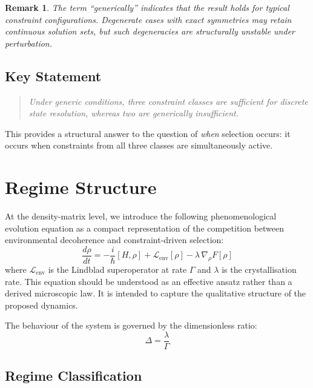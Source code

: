 \documentclass[12pt]{article}
\newtheorem{remark}[theorem]{Remark}
\begin{document}
\begin{remark}
The term ``generically'' indicates that the result holds for typical constraint configurations. Degenerate cases with exact symmetries may retain continuous solution sets, but such degeneracies are structurally unstable under perturbation.
\end{remark}

\subsection{Key Statement}

\begin{quote}
\textit{Under generic conditions, three constraint classes are sufficient for discrete state resolution, whereas two are generically insufficient.}
\end{quote}

This provides a structural answer to the question of \textit{when} selection occurs: it occurs when constraints from all three classes are simultaneously active.

\section{Regime Structure}\label{sec:regimes}

At the density-matrix level, we introduce the following phenomenological evolution equation as a compact representation of the competition between environmental decoherence and constraint-driven selection:
\begin{equation}\label{eq:master}
    \frac{d\rho}{dt} = -\frac{i}{\hbar}[H, \rho] + \mathcal{L}_{\mathrm{env}}[\rho] - \lambda\, \nabla_\rho F[\rho]
\end{equation}
where $\mathcal{L}_{\mathrm{env}}$ is the Lindblad superoperator at rate $\Gamma$ and $\lambda$ is the crystallisation rate. This equation should be understood as an effective ansatz rather than a derived microscopic law. It is intended to capture the qualitative structure of the proposed dynamics.

The behaviour of the system is governed by the dimensionless ratio:
\begin{equation}
    \Delta = \frac{\lambda}{\Gamma}
\end{equation}

\subsection{Regime Classification}
\end{document}
